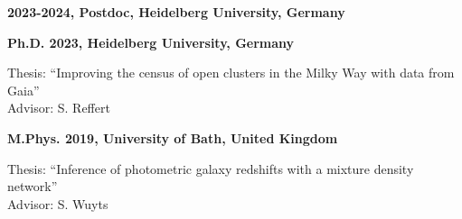 \textbf{2023-2024, Postdoc, Heidelberg University, Germany}
\vspace{0.2cm}

\textbf{Ph.D. 2023, Heidelberg University, Germany}
\begin{addmargin}[2em]{0em}
    Thesis: ``Improving the census of open clusters in the Milky Way with data from Gaia''\\
    Advisor: S. Reffert
\end{addmargin}
\vspace{0.2cm}

\textbf{M.Phys. 2019, University of Bath, United Kingdom}
\begin{addmargin}[2em]{0em}
    Thesis: ``Inference of photometric galaxy redshifts with a mixture density network''\\
    Advisor: S. Wuyts
\end{addmargin}